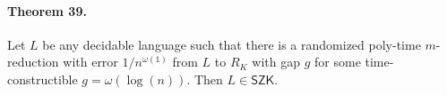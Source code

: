 \paragraph{Theorem 39.}
Let $L$ be any decidable language such that there is a randomized poly-time $m$-reduction with error $1/n^{\omega(1)}$ from $L$ to $R_K$ with gap $g$ for some time-constructible $g=\omega(\log(n))$. Then $L\in\mathsf{SZK}$.
